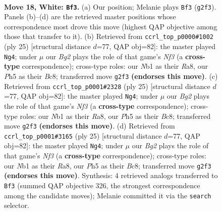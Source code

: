 \documentclass[11pt]{article}
\begin{document}
\clearpage

\begin{figure}[p]\centering
\begin{subfigure}{0.46\textwidth}\centering
\resizebox{\linewidth}{!}{%
\newchessgame
\chessboard[
  setfen={nrb2rk1/p4pbp/3q4/1pp1pn1P/8/3PP3/PP3PB1/RNBQNRK1 w - - 2 18},
  showmover=false,
  pgfstyle=straightmove, color=movearrow, markmove={g2-f3}
]}
\caption{}
\end{subfigure}\hfill
\begin{subfigure}{0.46\textwidth}\centering
\resizebox{\linewidth}{!}{%
\newchessgame
\chessboard[
  setfen={r1bqr1k1/p3bppp/2pp1n2/8/4PB2/2NQ4/PPP1B1PP/R4R1K b - - 2 13},
  showmover=false,
  pgfstyle=straightmove, color=movearrow, markmove={f6-g4}
]}
\caption{}
\end{subfigure}
\\[4pt]
\begin{subfigure}{0.46\textwidth}\centering
\resizebox{\linewidth}{!}{%
\newchessgame
\chessboard[
  setfen={r1bqr1k1/p3bppp/2pp1n2/8/4PB2/2NQ4/PPP1B1PP/R4R1K b - - 2 13},
  showmover=false,
  pgfstyle=straightmove, color=movearrow, markmove={f6-g4}
]}
\caption{}
\end{subfigure}\hfill
\begin{subfigure}{0.46\textwidth}\centering
\resizebox{\linewidth}{!}{%
\newchessgame
\chessboard[
  setfen={r1bqr1k1/p3bppp/2pp1n2/8/4PB2/2NQ4/PPP1B1PP/R4R1K b - - 2 13},
  showmover=false,
  pgfstyle=straightmove, color=movearrow, markmove={f6-g4}
]}
\caption{}
\end{subfigure}
\caption{\textbf{Move 18, White: \texttt{Bf3}.} (a) Our position; Melanie plays \texttt{Bf3} (\texttt{g2f3}). Panels (b)--(d) are the retrieved master positions whose correspondence most drove this move (highest QAP objective among those that transfer to it). (b) Retrieved from \texttt{ccrl\_top\_p0000\#1002} (ply 25) [structural distance $d$=77, QAP obj=82]: the master played \texttt{Ng4}; under $\mu$ our \emph{Bg2} plays the role of that game's \emph{Nf3} (a \textbf{cross-type} correspondence); cross-type roles: our \emph{N}b1 as their \emph{R}a8, our \emph{P}h5 as their \emph{B}c8; transferred move \texttt{g2f3} \textbf{(endorses this move)}. (c) Retrieved from \texttt{ccrl\_top\_p0001\#2328} (ply 25) [structural distance $d$=77, QAP obj=82]: the master played \texttt{Ng4}; under $\mu$ our \emph{Bg2} plays the role of that game's \emph{Nf3} (a \textbf{cross-type} correspondence); cross-type roles: our \emph{N}b1 as their \emph{R}a8, our \emph{P}h5 as their \emph{B}c8; transferred move \texttt{g2f3} \textbf{(endorses this move)}. (d) Retrieved from \texttt{ccrl\_top\_p0001\#3165} (ply 25) [structural distance $d$=77, QAP obj=82]: the master played \texttt{Ng4}; under $\mu$ our \emph{Bg2} plays the role of that game's \emph{Nf3} (a \textbf{cross-type} correspondence); cross-type roles: our \emph{N}b1 as their \emph{R}a8, our \emph{P}h5 as their \emph{B}c8; transferred move \texttt{g2f3} \textbf{(endorses this move)}. Synthesis: 4 retrieved analogs transferred to \texttt{Bf3} (summed QAP objective 326, the strongest correspondence among the candidate moves); Melanie committed it via the \texttt{search} selector.}
\label{fig:thought-m34}
\end{figure}
\end{document}

